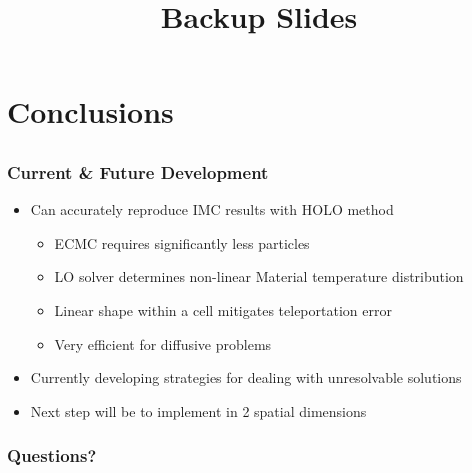 \documentclass[xcolor=dvipsnames,hyperref={pdfpagelabels=false},unknownkeysallowed]{beamer}
\newcommand{\coly}[1]{{\color{yellow} #1}}
\newlength{\wideitemsep}
\let\olditem\item
\renewcommand{\item}{\setlength{\itemsep}{\wideitemsep}\olditem}
\begin{document}
\section{Conclusions}
\subsection{}

\begin{frame}
    \frametitle{Current \& Future Development}
    \begin{itemize}
        \item Can accurately reproduce IMC results with HOLO method
        \begin{itemize}
            \item ECMC requires significantly less particles
            \item LO solver determines non-linear Material temperature distribution
            \item Linear shape within a cell mitigates teleportation error
            \item Very efficient for diffusive problems
        \end{itemize}
    \item Currently developing strategies for dealing with unresolvable solutions
    \item Next step will be to implement in 2 spatial dimensions
    \end{itemize}
\end{frame}

\date{}
\begin{frame}
    \frametitle{{\LARGE\coly{Questions?}}}
    \vspace{-0.21in}
    \titlepage \vspace{-0.2113in}
\end{frame}

\appendix
{}
\setcounter{finalframe}{\value{framenumber}}

\title{Backup Slides}
\author{}
\date{}
\end{document}
